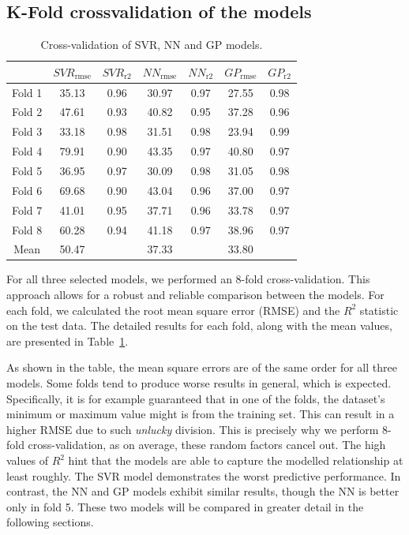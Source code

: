 \subsection*{K-Fold crossvalidation of the models}
\begin{table}[h]
	\centering
	\caption{Cross-validation of SVR, NN and GP models.} 
	\begin{tabular}{ c c c c c c c }
		\toprule
		\  & $SVR_\mathrm{rmse}$& $SVR_\mathrm{r2}$ & $NN_\mathrm{rmse}$   & $NN_\mathrm{r2}$ & $GP_\mathrm{rmse}$ & $GP_\mathrm{r2}$ \\ 
		\midrule
		Fold 1 & 35.13 & 0.96 & 30.97 & 0.97 & 27.55 & 0.98 \\ 
		Fold 2 & 47.61 & 0.93 & 40.82 & 0.95 & 37.28 & 0.96 \\ 
		Fold 3 & 33.18 & 0.98 & 31.51 & 0.98 & 23.94 & 0.99 \\ 
		Fold 4 & 79.91 & 0.90 & 43.35 & 0.97 & 40.80 & 0.97 \\ 
		Fold 5 & 36.95 & 0.97 & 30.09 & 0.98 & 31.05 & 0.98 \\ 
		Fold 6 & 69.68 & 0.90 & 43.04 & 0.96 & 37.00 & 0.97 \\ 
		Fold 7 & 41.01 & 0.95 & 37.71 & 0.96 & 33.78 & 0.97 \\ 
		Fold 8 & 60.28 & 0.94 & 41.18 & 0.97 & 38.96 & 0.97 \\ 
		\midrule
		Mean & 50.47 & & 37.33 & & 33.80 & \\ 
		\bottomrule
	\end{tabular}
	\label{tab:cross-val} 
\end{table}

For all three selected models, we performed an 8-fold cross-validation. This approach allows for a robust and reliable comparison between the models. For each fold, we calculated the root mean square error (RMSE) and the $R^2$ statistic on the test data. The detailed results for each fold, along with the mean values, are presented in Table~\ref{tab:cross-val}.

As shown in the table, the mean square errors are of the same order for all three models. Some folds tend to produce worse results in general, which is expected. Specifically, it is for example guaranteed that in one of the folds, the dataset's minimum or maximum value might is from the training set. This can result in a higher RMSE due to such \textit{unlucky} division. This is precisely why we perform 8-fold cross-validation, as on average, these random factors cancel out. The high values of $R^2$ hint that the models are able to capture the modelled relationship at least roughly. The SVR model demonstrates the worst predictive performance. In contrast, the NN and GP models exhibit similar results, though the NN is better only in fold 5. These two models will be compared in greater detail in the following sections.


